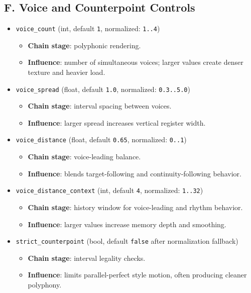 \documentclass[11pt,a4paper]{article}
\begin{document}
\subsection*{F. Voice and Counterpoint Controls}
\begin{itemize}
  \item \texttt{voice\_count} (int, default \texttt{1}, normalized: \texttt{1..4})
  \begin{itemize}
    \item \textbf{Chain stage}: polyphonic rendering.
    \item \textbf{Influence}: number of simultaneous voices; larger values create denser texture and heavier load.
  \end{itemize}

  \item \texttt{voice\_spread} (float, default \texttt{1.0}, normalized: \texttt{0.3..5.0})
  \begin{itemize}
    \item \textbf{Chain stage}: interval spacing between voices.
    \item \textbf{Influence}: larger spread increases vertical register width.
  \end{itemize}

  \item \texttt{voice\_distance} (float, default \texttt{0.65}, normalized: \texttt{0..1})
  \begin{itemize}
    \item \textbf{Chain stage}: voice-leading balance.
    \item \textbf{Influence}: blends target-following and continuity-following behavior.
  \end{itemize}

  \item \texttt{voice\_distance\_context} (int, default \texttt{4}, normalized: \texttt{1..32})
  \begin{itemize}
    \item \textbf{Chain stage}: history window for voice-leading and rhythm behavior.
    \item \textbf{Influence}: larger values increase memory depth and smoothing.
  \end{itemize}

  \item \texttt{strict\_counterpoint} (bool, default \texttt{false} after normalization fallback)
  \begin{itemize}
    \item \textbf{Chain stage}: interval legality checks.
    \item \textbf{Influence}: limits parallel-perfect style motion, often producing cleaner polyphony.
  \end{itemize}
\end{itemize}
\end{document}
